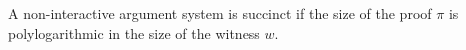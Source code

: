 \begin{definition}[Succinctness]
    A non-interactive argument system is succinct if the size of the proof $\pi$
    is polylogarithmic in the size of the witness $w$.
\end{definition}